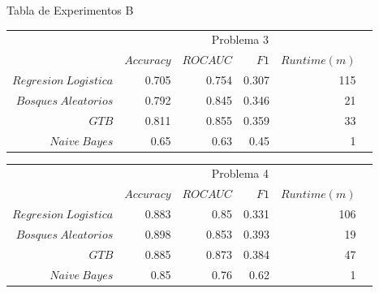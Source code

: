 \documentclass[xcolor=x11names]{beamer}
\newcommand{\ra}[1]{\renewcommand{\arraystretch}{#1}}
\begin{document}
\begin{frame}{Tabla de Experimentos B}

	\begin{table}[htp]\centering
	\footnotesize
		\ra{1.3}
		\begin{tabular}{@{}rr@{\hskip 0.3cm}r@{\hskip 0.3cm}r@{\hskip 0.3cm}rc@{}} \toprule
			&  \multicolumn{4}{c}{Problema 3} \\
			\cmidrule{2-5}
			& $Accuracy$ & $ROC AUC$ & $F1$ & $Runtime  (m)$ \\ \midrule
			$Regresion \ Logistica$     & 0.705 & 0.754 & 0.307 & 115 \\
			$Bosques \ Aleatorios$            &  0.792 & 0.845 & 0.346 & 21 \\
			$GTB$ & 0.811 & 0.855 & 0.359 & 33 \\
			$Naive \ Bayes$               & 0.65  & 0.63  & 0.45  & 1  \\

			\bottomrule
		\end{tabular}
		\ra{1.3}
		\begin{tabular}{@{}rr@{\hskip 0.3cm}r@{\hskip 0.3cm}r@{\hskip 0.3cm}rc@{}} \toprule
			&  \multicolumn{4}{c}{Problema 4} \\
			\cmidrule{2-5}
			& $Accuracy$ & $ROC AUC$ & $F1$ & $Runtime  (m)$ \\ \midrule
			$Regresion \ Logistica$     & 0.883 & 0.85  & 0.331 & 106 \\
			$Bosques \ Aleatorios$            & 0.898 & 0.853 & 0.393 & 19 \\
			$GTB$ & 0.885 & 0.873 & 0.384 & 47 \\
			$Naive \ Bayes$               & 0.85  & 0.76  & 0.62 & 1 \\

			\bottomrule
		\end{tabular}
	\end{table}

\end{frame}
\end{document}
